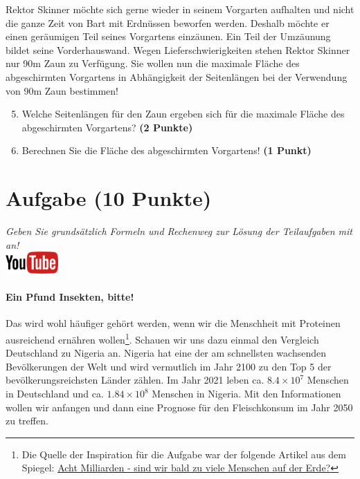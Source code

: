 \documentclass[a4paper, 9pt]{scrartcl}\usepackage[]{graphicx}\usepackage[]{xcolor}
\begin{document}
Rektor Skinner m{\"o}chte sich gerne wieder in seinem Vorgarten aufhalten und
nicht die ganze Zeit von Bart mit Erdn{\"u}ssen beworfen werden. Deshalb m{\"o}chte
er einen ger{\"a}umigen Teil seines Vorgartens einz{\"a}unen. Ein Teil der
Umz{\"a}unung bildet seine Vorderhauswand. Wegen Lieferschwierigkeiten stehen
Rektor Skinner nur 90m Zaun zu Verf{\"u}gung. Sie wollen nun die
maximale Fl{\"a}che des abgeschirmten Vorgartens in Abh{\"a}ngigkeit der
Seitenl{\"a}ngen bei der Verwendung von 90m Zaun bestimmen!

\begin{enumerate}
  \setcounter{enumi}{4}  
\item  Welche Seitenl{\"a}ngen f{\"u}r den Zaun ergeben sich f{\"u}r die
  maximale Fl{\"a}che des abgeschirmten Vorgartens? \textbf{(2 Punkte)}
\item Berechnen Sie die Fl{\"a}che des abgeschirmten Vorgartens! \textbf{(1
    Punkt)}
\end{enumerate}

 
\clearpage

\section{Aufgabe \hfill (10 Punkte)}

\textit{Geben Sie grunds{\"a}tzlich Formeln und Rechenweg zur L{\"o}sung der
  Teilaufgaben mit an!} \\[1Ex]

\hfill\href{https://youtu.be/OhyuH6hzEhY}{\includegraphics[width = 2cm]{img/youtube}} %
\hspace{2Ex}




\paragraph{Ein Pfund Insekten, bitte!} Das wird wohl h{\"a}ufiger geh{\"o}rt
werden, wenn wir die Menschheit mit Proteinen ausreichend ern{\"a}hren
wollen\footnote{Die Quelle der Inspiration f{\"u}r die Aufgabe war der folgende
  Artikel aus dem Spiegel:
  \href{https://www.spiegel.de/ausland/ueberbevoelkerung-acht-milliarden-sind-wir-bald-zu-viele-menschen-auf-der-erde-a-3f20c7bc-3d60-4440-9f52-eb338db207f5}{Acht
    Milliarden - sind wir bald zu viele Menschen auf der Erde?}}. Schauen
wir uns dazu einmal den Vergleich Deutschland zu Nigeria an. Nigeria hat
eine der am schnellsten wachsenden Bev{\"o}lkerungen der Welt und wird
vermutlich im Jahr 2100 zu den Top 5 der bev{\"o}lkerungsreichsten L{\"a}nder
z{\"a}hlen. Im Jahr 2021 leben ca. \ensuremath{8.4\times 10^{7}} Menschen in
Deutschland und ca. \ensuremath{1.84\times 10^{8}} Menschen in Nigeria. Mit den
Informationen wollen wir anfangen und dann eine Prognose f{\"u}r den
Fleischkonsum im Jahr 2050 zu treffen. \\ 
\end{document}
